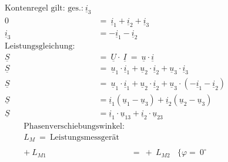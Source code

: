 \begin{enumerate}[label=\alph*)]
        \begin{align*}
          \text{Kontenregel gilt: ges.:}\  \underline{i}_3                                                                                                                 \\
          0               & =\ \underline{i}_1 + \underline{i}_2 + \underline{i}_3                                                                                         \\
          \underline{i}_3 & = - \underline{i}_1 - \underline{i}_2                                                                                                          \\
          \text{Leistungsgleichung:}                                                                                                                                       \\
          \underline{S}   & =\ \underline{U} \cdot\ \underline{I}\ =\ \underline{u} \cdot \underline{i}                                                                    \\
          \underline{S}   & =\ \underline{u}_1 \cdot \underline{i}_1 + \underline{u}_2 \cdot \underline{i}_2 + \underline{u}_3 \cdot \underline{i}_3                       \\
          \underline{S}   & =\ \underline{u}_1 \cdot \underline{i}_1 + \underline{u}_2 \cdot \underline{i}_2 + \underline{u}_3 \cdot (- \underline{i}_1 - \underline{i}_2) \\
          \underline{S}   & = \underline{i}_1(\underline{u}_1 - \underline{u}_3) + \underline{i}_2(\underline{u}_2 - \underline{u}_3)                                      \\
          \underline{S}   & = \underline{i}_1\cdot\underline{u}_{13} + \underline{i}_2\cdot\underline{u}_{23}
        \end{align*}
        \begin{align*}
          \text{Phasenverschiebungswinkel:}                                          \\
          L_{M}\ =\ \text{Leistungsmessgerät}                                        \\ \ \\
          +\ L_{M1}   & =\ +\ L_{M2}\ \ \ \ \{ \varphi =\ 0^\circ                    \\

\end{align*}
\end{enumerate}
